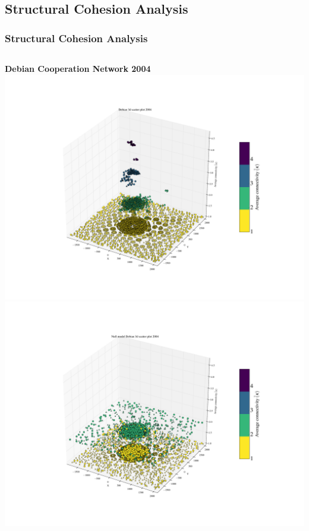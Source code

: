 \documentclass[ignorenonframetext,red,8pt]{beamer}
\begin{document}
\subsection{Structural Cohesion Analysis}

\begin{frame}
\frametitle{Structural Cohesion Analysis}

\begin{columns}[c]
\begin{column}{0.5\textwidth}
\begin{center}
\textbf{Debian Cooperation Network 2004}
\includegraphics[scale=0.12]{../../figures/3d_scatter_debian_2004}
\newline
\includegraphics[scale=0.12]{../../figures/3d_scatter_debian_2004_null}
\end{center}
\end{column}


\end{columns}
\end{frame}
\end{document}
